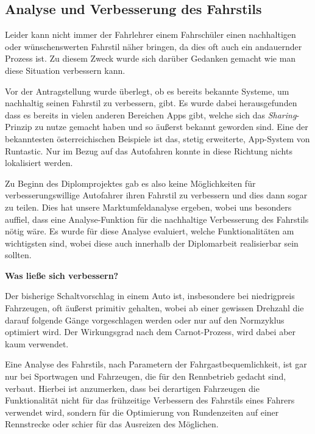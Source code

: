 \subsection{Analyse und Verbesserung des Fahrstils}

Leider kann nicht immer der Fahrlehrer einem Fahrschüler einen nachhaltigen oder wünschenswerten Fahrstil näher bringen, da dies oft auch ein andauernder Prozess ist.  Zu diesem Zweck wurde sich darüber Gedanken gemacht wie man diese Situation verbessern kann.

 Vor der Antragstellung wurde überlegt, ob es bereits bekannte Systeme, um nachhaltig seinen Fahrstil zu verbessern, gibt. Es wurde dabei herausgefunden dass es bereits in vielen anderen Bereichen Apps gibt, welche sich das \textit{Sharing}-Prinzip zu nutze gemacht haben und so äußerst bekannt geworden sind. Eine der bekanntesten österreichischen Beispiele ist das, stetig erweiterte, App-System von Runtastic. \cite{Businessplan.Runtastic}
Nur im Bezug auf das Autofahren konnte in diese Richtung nichts lokalisiert werden.

Zu Beginn des Diplomprojektes gab es also keine Möglichkeiten für verbesserungswillige Autofahrer ihren Fahrstil zu verbessern und dies dann sogar zu teilen. 
Dies hat unsere Marktumfeldanalyse ergeben, wobei uns besonders auffiel, dass eine Analyse-Funktion für die nachhaltige Verbesserung des Fahrstils nötig wäre. Es wurde für diese Analyse evaluiert, welche Funktionalitäten am wichtigsten sind, wobei diese auch innerhalb der Diplomarbeit realisierbar sein sollten. 
\newline


\textbf{Was ließe sich verbessern?} 

Der bisherige Schaltvorschlag in einem Auto ist, insbesondere bei niedrigpreis Fahrzeugen, oft äußerst primitiv gehalten, wobei ab einer gewissen Drehzahl die darauf folgende Gänge vorgeschlagen werden oder nur auf den Normzyklus optimiert wird. \cite{Schaltempfehlung} Der Wirkungsgrad nach dem Carnot-Prozess, wird dabei aber kaum verwendet. \cite{Carnot.Wirkungsgrad} 

Eine Analyse des Fahrstils, nach Parametern der Fahrgastbequemlichkeit, ist gar nur bei Sportwagen und Fahrzeugen, die für den Rennbetrieb gedacht sind, verbaut. Hierbei ist anzumerken, dass bei derartigen Fahrzeugen die Funktionalität nicht für das frühzeitige Verbessern des Fahrstils eines Fahrers verwendet wird, sondern für die Optimierung von Rundenzeiten auf einer Rennstrecke oder schier für das Ausreizen des Möglichen.

